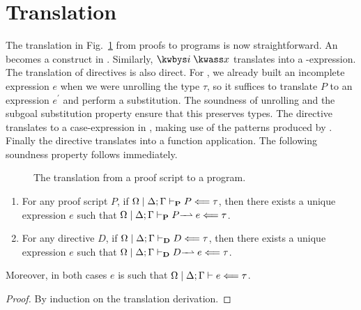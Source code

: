 \section{Translation}
\label{sec:translation}

The translation in Fig.~\ref{fig:translation} from proofs to \Beluga{} programs
is now straightforward. An \kwunbox{} becomes a \tletboxs
construct in \Beluga. Similarly, $\kwbys i\;\kwass x$ translates into
a \tlet-expression. The translation of directives is also direct. For
\kwintros, we already built an incomplete expression $e$ when we were unrolling
the type $\tau$, so it suffices to translate $P$ to an expression $e^\prime$ and
perform a substitution. The soundness of unrolling and the subgoal substitution
property ensure that this preserves types.
The \kwsplit{} directive translates to
a case-expression in \Beluga{}, making use of the patterns produced by \scov.
Finally the \kwsuffices{} directive translates into a function application.
The following soundness property follows immediately.

\begin{figure}[htp]
  \caption{%
    The translation from a \Harpoon{} proof script to a \Beluga{} program.%
  }%
  \label{fig:translation}
\end{figure}%

\begin{thm}
  \mutualtheorems
  \begin{enumerate}
  \item
    For any proof script $P$, if $\Omega \mid \Delta; \Gamma \vdash_\mathbf{P} P \Longleftarrow \tau$,
    then there exists a unique expression $e$ such that
    $ \Omega \mid \Delta; \Gamma \vdash_\mathbf{P} P -\!\!\!\!\rightharpoonup e \Longleftarrow \tau $.

  \item
    For any directive $D$, if $\Omega\mid\Delta; \Gamma \vdash_\mathbf{D} D \Longleftarrow \tau$,
    then there exists a unique expression $e$ such that
    $ \Omega\mid\Delta; \Gamma \vdash_\mathbf{D} D -\!\!\!\!\rightharpoonup e \Longleftarrow \tau $.
  \end{enumerate}

  Moreover, in both cases $e$ is such that
  $\Omega\mid\Delta; \Gamma \vdash e \Longleftarrow \tau$.
\end{thm}

\begin{proof}
  By induction on the translation derivation.
\end{proof}

%
